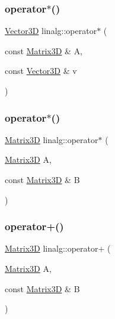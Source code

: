 \subsubsection{\texorpdfstring{operator$\ast$()}{operator*()}\hspace{0.1cm}{\footnotesize\ttfamily [1/2]}}
{\footnotesize\ttfamily \mbox{\hyperlink{classVector3D}{Vector3D}} linalg\+::operator$\ast$ (\begin{DoxyParamCaption}\item[{const \mbox{\hyperlink{classlinalg_1_1Matrix3D}{Matrix3D}} \&}]{A,  }\item[{const \mbox{\hyperlink{classVector3D}{Vector3D}} \&}]{v }\end{DoxyParamCaption})}

\mbox{\label{namespacelinalg_a6bacae184309d12c829d272de83d0534}} 
\subsubsection{\texorpdfstring{operator$\ast$()}{operator*()}\hspace{0.1cm}{\footnotesize\ttfamily [2/2]}}
{\footnotesize\ttfamily \mbox{\hyperlink{classlinalg_1_1Matrix3D}{Matrix3D}} linalg\+::operator$\ast$ (\begin{DoxyParamCaption}\item[{\mbox{\hyperlink{classlinalg_1_1Matrix3D}{Matrix3D}}}]{A,  }\item[{const \mbox{\hyperlink{classlinalg_1_1Matrix3D}{Matrix3D}} \&}]{B }\end{DoxyParamCaption})}

\mbox{\label{namespacelinalg_a556fef68037fa24314207620fa918536}} 
\subsubsection{\texorpdfstring{operator+()}{operator+()}}
{\footnotesize\ttfamily \mbox{\hyperlink{classlinalg_1_1Matrix3D}{Matrix3D}} linalg\+::operator+ (\begin{DoxyParamCaption}\item[{\mbox{\hyperlink{classlinalg_1_1Matrix3D}{Matrix3D}}}]{A,  }\item[{const \mbox{\hyperlink{classlinalg_1_1Matrix3D}{Matrix3D}} \&}]{B }\end{DoxyParamCaption})}

